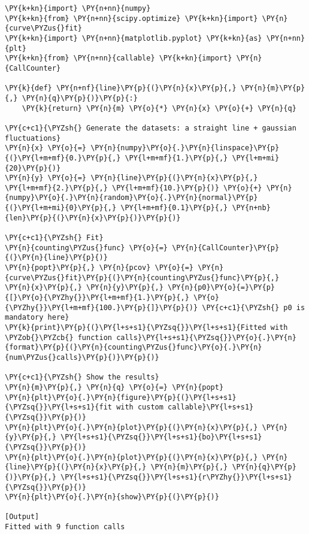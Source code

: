 \begin{Verbatim}[label=\makebox{\url{https://bitbucket.org/lbaldini/programming/src/tip/snippets/test\_callable.py}},commandchars=\\\{\}]
\PY{k+kn}{import} \PY{n+nn}{numpy}
\PY{k+kn}{from} \PY{n+nn}{scipy.optimize} \PY{k+kn}{import} \PY{n}{curve\PYZus{}fit}
\PY{k+kn}{import} \PY{n+nn}{matplotlib.pyplot} \PY{k+kn}{as} \PY{n+nn}{plt}
\PY{k+kn}{from} \PY{n+nn}{callable} \PY{k+kn}{import} \PY{n}{CallCounter}

\PY{k}{def} \PY{n+nf}{line}\PY{p}{(}\PY{n}{x}\PY{p}{,} \PY{n}{m}\PY{p}{,} \PY{n}{q}\PY{p}{)}\PY{p}{:}
    \PY{k}{return} \PY{n}{m} \PY{o}{*} \PY{n}{x} \PY{o}{+} \PY{n}{q}

\PY{c+c1}{\PYZsh{} Generate the datasets: a straight line + gaussian fluctuations}
\PY{n}{x} \PY{o}{=} \PY{n}{numpy}\PY{o}{.}\PY{n}{linspace}\PY{p}{(}\PY{l+m+mf}{0.}\PY{p}{,} \PY{l+m+mf}{1.}\PY{p}{,} \PY{l+m+mi}{20}\PY{p}{)}
\PY{n}{y} \PY{o}{=} \PY{n}{line}\PY{p}{(}\PY{n}{x}\PY{p}{,} \PY{l+m+mf}{2.}\PY{p}{,} \PY{l+m+mf}{10.}\PY{p}{)} \PY{o}{+} \PY{n}{numpy}\PY{o}{.}\PY{n}{random}\PY{o}{.}\PY{n}{normal}\PY{p}{(}\PY{l+m+mi}{0}\PY{p}{,} \PY{l+m+mf}{0.1}\PY{p}{,} \PY{n+nb}{len}\PY{p}{(}\PY{n}{x}\PY{p}{)}\PY{p}{)}

\PY{c+c1}{\PYZsh{} Fit}
\PY{n}{counting\PYZus{}func} \PY{o}{=} \PY{n}{CallCounter}\PY{p}{(}\PY{n}{line}\PY{p}{)}
\PY{n}{popt}\PY{p}{,} \PY{n}{pcov} \PY{o}{=} \PY{n}{curve\PYZus{}fit}\PY{p}{(}\PY{n}{counting\PYZus{}func}\PY{p}{,} \PY{n}{x}\PY{p}{,} \PY{n}{y}\PY{p}{,} \PY{n}{p0}\PY{o}{=}\PY{p}{[}\PY{o}{\PYZhy{}}\PY{l+m+mf}{1.}\PY{p}{,} \PY{o}{\PYZhy{}}\PY{l+m+mf}{100.}\PY{p}{]}\PY{p}{)} \PY{c+c1}{\PYZsh{} p0 is mandatory here}
\PY{k}{print}\PY{p}{(}\PY{l+s+s1}{\PYZsq{}}\PY{l+s+s1}{Fitted with \PYZob{}\PYZcb{} function calls}\PY{l+s+s1}{\PYZsq{}}\PY{o}{.}\PY{n}{format}\PY{p}{(}\PY{n}{counting\PYZus{}func}\PY{o}{.}\PY{n}{num\PYZus{}calls}\PY{p}{)}\PY{p}{)}

\PY{c+c1}{\PYZsh{} Show the results}
\PY{n}{m}\PY{p}{,} \PY{n}{q} \PY{o}{=} \PY{n}{popt}
\PY{n}{plt}\PY{o}{.}\PY{n}{figure}\PY{p}{(}\PY{l+s+s1}{\PYZsq{}}\PY{l+s+s1}{fit with custom callable}\PY{l+s+s1}{\PYZsq{}}\PY{p}{)}
\PY{n}{plt}\PY{o}{.}\PY{n}{plot}\PY{p}{(}\PY{n}{x}\PY{p}{,} \PY{n}{y}\PY{p}{,} \PY{l+s+s1}{\PYZsq{}}\PY{l+s+s1}{bo}\PY{l+s+s1}{\PYZsq{}}\PY{p}{)}
\PY{n}{plt}\PY{o}{.}\PY{n}{plot}\PY{p}{(}\PY{n}{x}\PY{p}{,} \PY{n}{line}\PY{p}{(}\PY{n}{x}\PY{p}{,} \PY{n}{m}\PY{p}{,} \PY{n}{q}\PY{p}{)}\PY{p}{,} \PY{l+s+s1}{\PYZsq{}}\PY{l+s+s1}{r\PYZhy{}}\PY{l+s+s1}{\PYZsq{}}\PY{p}{)}
\PY{n}{plt}\PY{o}{.}\PY{n}{show}\PY{p}{(}\PY{p}{)}

[Output]
Fitted with 9 function calls
\end{Verbatim}